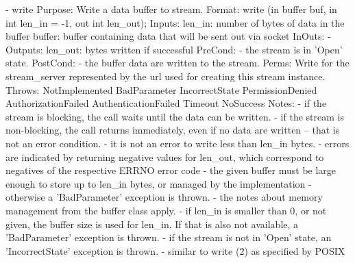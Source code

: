 \begin{myspec}
 
    - write
      Purpose:  Write a data buffer to stream.
      Format:   write                (in  buffer        buf,
                                      in  int           len_in = -1,
                                      out int           len_out);
      Inputs:   len_in:               number of bytes of data in
                                      the buffer
                buffer:               buffer containing data
                                      that will be sent out via
                                      socket
      InOuts:   -
      Outputs:  len_out:              bytes written if successful
      PreCond:  - the stream is in 'Open' state.
      PostCond: - the buffer data are written to the stream.
      Perms:    Write for the stream_server represented by the
                url used for creating this stream instance.
      Throws:   NotImplemented
                BadParameter
                IncorrectState
                PermissionDenied
                AuthorizationFailed
                AuthenticationFailed
                Timeout
                NoSuccess
      Notes:    - if the stream is blocking, the call waits
                  until the data can be written.
                - if the stream is non-blocking, the call
                  returns immediately, even if no data are
                  written -- that is not an error condition.
                - it is not an error to write less than len_in
                  bytes.
                - errors are indicated by returning negative
                  values for len_out, which correspond to
                  negatives of the respective ERRNO error code
                - the given buffer must be large enough to
                  store up to len_in bytes, or managed by the
                  implementation - otherwise a 'BadParameter'
                  exception is thrown.
                - the notes about memory management from the
                  buffer class apply.
                - if len_in is smaller than 0, or not given, 
                  the buffer size is used for len_in.
                  If that is also not available, a
                  'BadParameter' exception is thrown.
                - if the stream is not in 'Open' state, an
                  'IncorrectState' exception is thrown.
                - similar to write (2) as specified by POSIX
 

\end{myspec}
